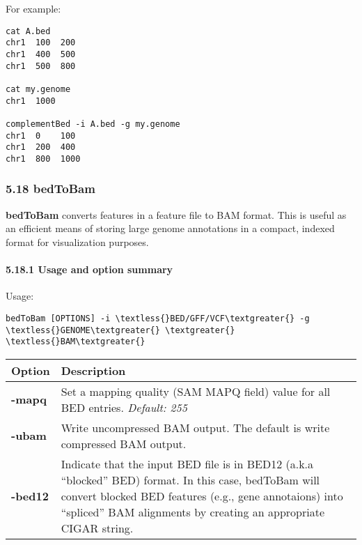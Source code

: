 \documentclass[letterpaper,10pt,english]{sphinxmanual}
\begin{document}
For example:

\begin{Verbatim}[commandchars=\\\{\}]
cat A.bed
chr1  100  200
chr1  400  500
chr1  500  800

cat my.genome
chr1  1000

complementBed -i A.bed -g my.genome
chr1  0    100
chr1  200  400
chr1  800  1000
\end{Verbatim}


\subsubsection{5.18 bedToBam}
\label{content/bedToBam::doc}\label{content/bedToBam:bedtobam}
\textbf{bedToBam} converts features in a feature file to BAM format. This is useful as an efficient means of
storing large genome annotations in a compact, indexed format for visualization purposes.


\paragraph{5.18.1 Usage and option summary}
\label{content/bedToBam:usage-and-option-summary}
Usage:

\begin{Verbatim}[commandchars=\\\{\}]
bedToBam [OPTIONS] -i \textless{}BED/GFF/VCF\textgreater{} -g \textless{}GENOME\textgreater{} \textgreater{} \textless{}BAM\textgreater{}
\end{Verbatim}

\begin{tabulary}{\linewidth}{|L|L|}
\hline
\textbf{
Option
} & \textbf{
Description
}\\\hline

\textbf{-mapq}
 & 
Set a mapping quality (SAM MAPQ field) value for all BED entries. \emph{Default: 255}
\\\hline

\textbf{-ubam}
 & 
Write uncompressed BAM output. The default is write compressed BAM output.
\\\hline

\textbf{-bed12}
 & 
Indicate that the input BED file is in BED12 (a.k.a ``blocked'' BED) format. In this case, bedToBam will convert blocked BED features (e.g., gene annotaions) into ``spliced'' BAM alignments by creating an appropriate CIGAR string.
\\\hline
\end{tabulary}
\end{document}
